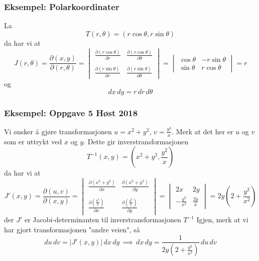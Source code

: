 \documentclass{article}
\begin{document}
\subsubsection{Eksempel: Polarkoordinater}
La
\[T(r, \theta) = (r\cos{\theta}, r\sin{\theta})\]
da har vi at
\[J(r, \theta) = \frac{\partial (x, y)}{\partial (r, \theta)} =
    \begin{vmatrix}
        \frac{\partial (r\cos{\theta})}{\partial r} & \frac{\partial (r\cos{\theta})}{\partial \theta}\\\\
        \frac{\partial (r\sin{\theta})}{\partial r} & \frac{\partial (r\sin{\theta})}{\partial \theta}
    \end{vmatrix}
    =
    \begin{vmatrix}
        \cos{\theta} & -r\sin{\theta}\\
        \sin{\theta} & r\cos{\theta}
    \end{vmatrix}
    = r
    \]
og
\[dx\,dy = r\,dr\,d\theta\]

\subsubsection{Eksempel: Oppgave 5 Høst 2018}
Vi ønsker å gjøre transformasjonen $u = x^2 + y^2$, $v = \frac{y^2}{x}$. Merk at det her er $u$ og $v$ som er uttrykt ved $x$ og $y$. Dette gir inverstransformasjonen
\[T^{-1}(x, y) = (x^2+y^2, \frac{y^2}{x})\]
da har vi at
\[J'(x, y) = \frac{\partial (u, v)}{\partial (x, y)} =
    \begin{vmatrix}
        \frac{\partial (x^2 + y^2)}{\partial x} & \frac{\partial (x^2 + y^2)}{\partial y}\\\\
        \frac{\partial (\frac{y^2}{x})}{\partial x} & \frac{\partial (\frac{y^2}{x})}{\partial y}
    \end{vmatrix}
    =
    \begin{vmatrix}
        2x & 2y\\
        -\frac{y^2}{x^2} & \frac{2y}{x}
    \end{vmatrix}
    = 2y \left(2 + \frac{y^2}{x^2}\right)
    \]
der $J'$ er Jacobi-determinanten til inverstransformasjonen $T^{-1}$ Igjen, merk at vi har gjort transformasjonen "andre veien", så
\[du\,dv = |J'(x, y)|\,dx\,dy \,\implies\, dx\,dy = \frac{1}{2y \left(2 + \frac{y^2}{x^2}\right)}\,du\,dv\]



\clearpage
\end{document}
